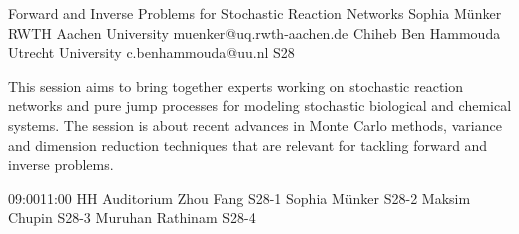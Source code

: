 \documentclass[12pt,lettersize,oneside]{book} %
\begin{document}
\clearpage

\begin{session}
 {Forward and Inverse Problems for Stochastic Reaction Networks}%
 {Sophia M\"unker}%
 {RWTH Aachen University}%
 {muenker@uq.rwth-aachen.de}%
 {Chiheb Ben Hammouda}%
 {Utrecht University}%
 {c.benhammouda@uu.nl}%
 {S28}%
 {}%

 This session aims to bring together experts working on stochastic reaction networks and pure jump processes for modeling stochastic biological and chemical systems. The session is about recent advances in Monte Carlo methods, variance and dimension reduction techniques that are relevant for tackling forward and inverse problems.
\end{session}



\sessionPart{}%
{\hfill{}
{09:00}{11:00} %
{HH Auditorium}} %
{Zhou Fang}
{S28-1}
{Sophia Münker}
{S28-2}
{Maksim Chupin}
{S28-3}
{Muruhan Rathinam}
{S28-4}



\clearpage
\end{document}
